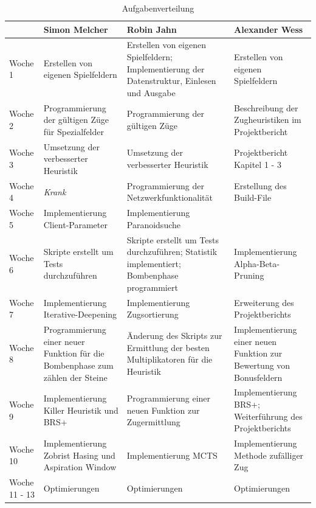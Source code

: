 \documentclass[12pt,a4paper,bibliography=totocnumbered,listof=totocnumbered]{article}
\begin{document}
\vspace{1em}
\begin{table}[H]
\centering
	\begin{tabular} {| m{2.6cm} | m{4cm} | m{4cm} | m{4cm}|}
		\hline
		\textbf{} &\textbf{Simon Melcher} & \textbf{Robin Jahn} & \textbf{Alexander Wess}\\
		\hline
		Woche 1 & Erstellen von eigenen Spielfeldern & Erstellen von eigenen Spielfeldern; Implementierung der Datenstruktur, Einlesen und Ausgabe & Erstellen von eigenen Spielfeldern\\
		\hline
		Woche 2 & Programmierung der gültigen Züge für Spezialfelder & Programmierung der gültigen Züge & Beschreibung der Zugheuristiken im Projektbericht\\
		\hline
		Woche 3 & Umsetzung der verbesserter Heuristik & Umsetzung der verbesserter Heuristik & Projektbericht Kapitel 1 - 3\\
		\hline
		Woche 4 & \textit{Krank} & Programmierung der Netzwerkfunktionalität & Erstellung des Build-File\\
		\hline
		Woche 5 & Implementierung Client-Parameter & Implementierung Paranoidsuche &\\
		\hline
		Woche 6 & Skripte erstellt um Tests durchzuführen & Skripte erstellt um Tests durchzuführen; Statistik implementiert; Bombenphase programmiert & Implementierung Alpha-Beta-Pruning\\
		\hline
		Woche 7 & Implementierung Iterative-Deepening & Implementierung Zugsortierung & Erweiterung des Projektberichts\\
		\hline
		Woche 8 & Programmierung einer neuer Funktion für die Bombenphase zum zählen der Steine & Änderung des Skripts zur Ermittlung der besten Multiplikatoren für die Heuristik & Implementierung einer neuen Funktion zur Bewertung von Bonusfeldern\\
		\hline
		Woche 9 & Implementierung Killer Heuristik und BRS+ & Programmierung einer neuen Funktion zur Zugermittlung & Implementierung BRS+; Weiterführung des Projektberichts\\
		\hline
		Woche 10 & Implementierung Zobrist Hasing und Aspiration Window & Implementierung MCTS & Implementierung Methode zufälliger Zug\\
		\hline
		Woche 11 - 13 & Optimierungen & Optimierungen & Optimierungen\\
		\hline
	\end{tabular}
	\caption{Aufgabenverteilung}
	\label{tab:tasks}
\end{table}
\end{document}
